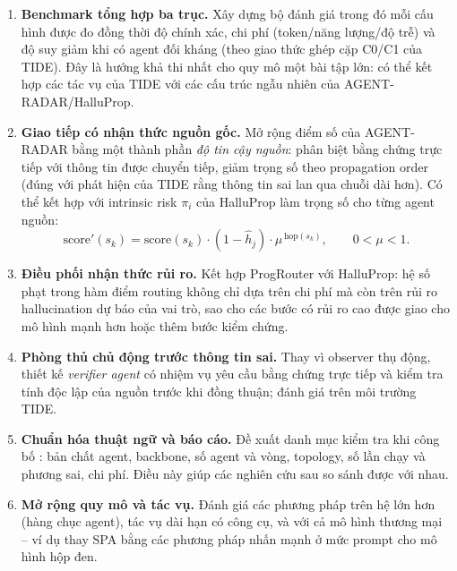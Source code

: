 \begin{enumerate}
  \item \textbf{Benchmark tổng hợp ba trục.} Xây dựng bộ đánh giá trong đó mỗi cấu hình \MAS{} được đo đồng thời độ chính xác, chi phí (token/năng lượng/độ trễ) và độ suy giảm khi có agent đối kháng (theo giao thức ghép cặp C0/C1 của TIDE). Đây là hướng khả thi nhất cho quy mô một bài tập lớn: có thể kết hợp các tác vụ của TIDE với các cấu trúc ngẫu nhiên của AGENT-RADAR/HalluProp.

  \item \textbf{Giao tiếp có nhận thức nguồn gốc.} Mở rộng điểm số của AGENT-RADAR bằng một thành phần \emph{độ tin cậy nguồn}: phân biệt bằng chứng trực tiếp với thông tin được chuyển tiếp, giảm trọng số theo propagation order (đúng với phát hiện của TIDE rằng thông tin sai lan qua chuỗi dài hơn). Có thể kết hợp với intrinsic risk $\pi_i$ của HalluProp làm trọng số cho từng agent nguồn:
  \begin{equation}
    \text{score}'(s_k) = \text{score}(s_k)\cdot(1 - \hat h_j)\cdot \mu^{\,\text{hop}(s_k)},\qquad 0<\mu<1.
  \end{equation}

  \item \textbf{Điều phối nhận thức rủi ro.} Kết hợp ProgRouter với HalluProp: hệ số phạt trong hàm điểm routing không chỉ dựa trên chi phí mà còn trên rủi ro hallucination dự báo của vai trò, sao cho các bước có rủi ro cao được giao cho mô hình mạnh hơn hoặc thêm bước kiểm chứng.

  \item \textbf{Phòng thủ chủ động trước thông tin sai.} Thay vì observer thụ động, thiết kế \emph{verifier agent} có nhiệm vụ yêu cầu bằng chứng trực tiếp và kiểm tra tính độc lập của nguồn trước khi đồng thuận; đánh giá trên môi trường TIDE.

  \item \textbf{Chuẩn hóa thuật ngữ và báo cáo.} Đề xuất danh mục kiểm tra khi công bố \MAS: bản chất agent, backbone, số agent và vòng, topology, số lần chạy và phương sai, chi phí. Điều này giúp các nghiên cứu sau so sánh được với nhau.

  \item \textbf{Mở rộng quy mô và tác vụ.} Đánh giá các phương pháp trên hệ lớn hơn (hàng chục agent), tác vụ dài hạn có công cụ, và với cả mô hình thương mại -- ví dụ thay SPA bằng các phương pháp nhấn mạnh ở mức prompt cho mô hình hộp đen.
\end{enumerate}
